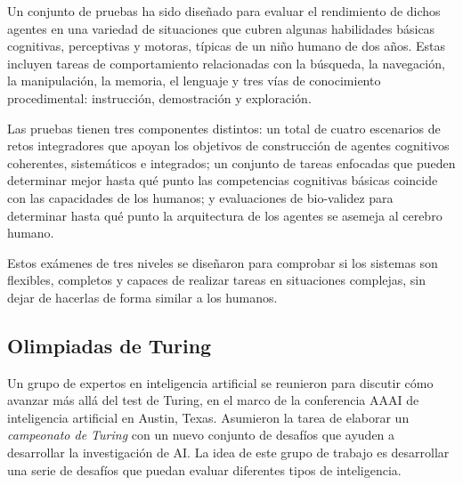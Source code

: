 Un conjunto de pruebas ha sido diseñado para evaluar el rendimiento de dichos agentes en una variedad de situaciones que cubren algunas habilidades básicas cognitivas, perceptivas y motoras, típicas de un niño humano de dos años. Estas incluyen tareas de comportamiento relacionadas con la búsqueda, la navegación, la manipulación, la memoria, el lenguaje y tres vías de conocimiento procedimental: instrucción, demostración y exploración.

Las pruebas tienen tres componentes distintos: un total de cuatro escenarios de retos integradores que apoyan los objetivos de construcción de agentes cognitivos coherentes, sistemáticos e integrados; un conjunto de tareas enfocadas que pueden determinar mejor hasta qué punto las competencias cognitivas básicas coincide con las capacidades de los humanos; y evaluaciones de bio-validez para determinar hasta qué punto la arquitectura de los agentes se asemeja al cerebro humano.
 
Estos exámenes de tres niveles se diseñaron para comprobar si los sistemas son flexibles, completos y capaces de realizar tareas en situaciones complejas, sin dejar de hacerlas de forma similar a los humanos.

\subsection{Olimpiadas de Turing}

Un grupo de expertos en inteligencia artificial se reunieron para discutir cómo avanzar más allá del test de Turing, en el marco de la conferencia AAAI de inteligencia artificial en Austin, Texas. Asumieron la tarea de elaborar un \textit{campeonato de Turing} con un nuevo conjunto de desafíos que ayuden a desarrollar la investigación de AI. La idea de este grupo de trabajo es desarrollar una serie de desafíos que puedan evaluar diferentes tipos de inteligencia.

